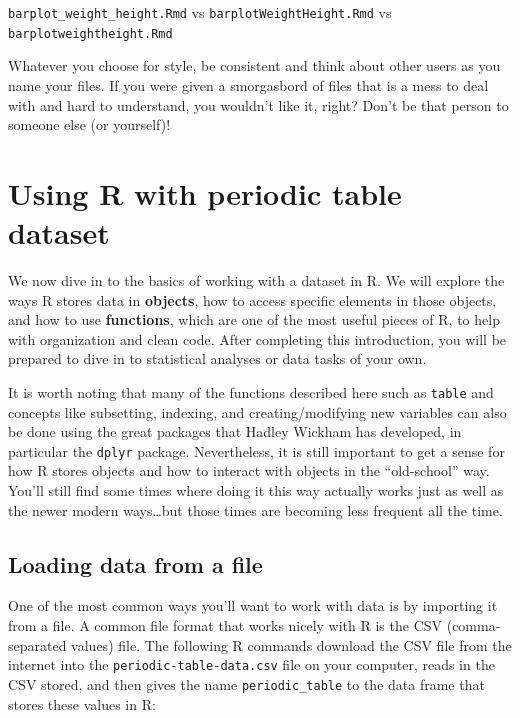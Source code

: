 \documentclass[]{tufte-book}
\begin{document}
\texttt{barplot\_weight\_height.Rmd} vs \texttt{barplotWeightHeight.Rmd} vs \texttt{barplotweightheight.Rmd}

Whatever you choose for style, be consistent and think about other users as you
name your files. If you were given a smorgasbord of files that is a mess to
deal with and hard to understand, you wouldn't like it, right? Don't be that
person to someone else (or yourself)!

\hypertarget{using-r-with-periodic-table-dataset}{%
\section{Using R with periodic table dataset}\label{using-r-with-periodic-table-dataset}}

We now dive in to the basics of working with a dataset in R. We will explore the ways R stores data in \textbf{objects}, how to access specific elements in those objects, and how to use \textbf{functions}, which are one of the most useful pieces of R, to help with organization and clean code. After completing this introduction, you will be prepared to dive in to statistical analyses or data tasks of your own.

It is worth noting that many of the functions described here such as \texttt{table} and concepts like subsetting, indexing, and creating/modifying new variables can also be done using the great packages that Hadley Wickham has developed, in particular the \texttt{dplyr} package. Nevertheless, it is still important to get a sense for how R stores objects and how to interact with objects in the ``old-school'' way. You'll still find some times where doing it this way actually works just as well as the newer modern ways\ldots but those times are becoming less frequent all the time.

\hypertarget{loading-data-from-a-file}{%
\subsection{Loading data from a file}\label{loading-data-from-a-file}}

One of the most common ways you'll want to work with data is by importing it from a file. A common file format that works nicely with R is the CSV (comma-separated values) file. The following R commands download the CSV file from the internet into the \texttt{periodic-table-data.csv} file on your computer, reads in the CSV stored, and then gives the name \texttt{periodic\_table} to the data frame that stores these values in R:
\end{document}
